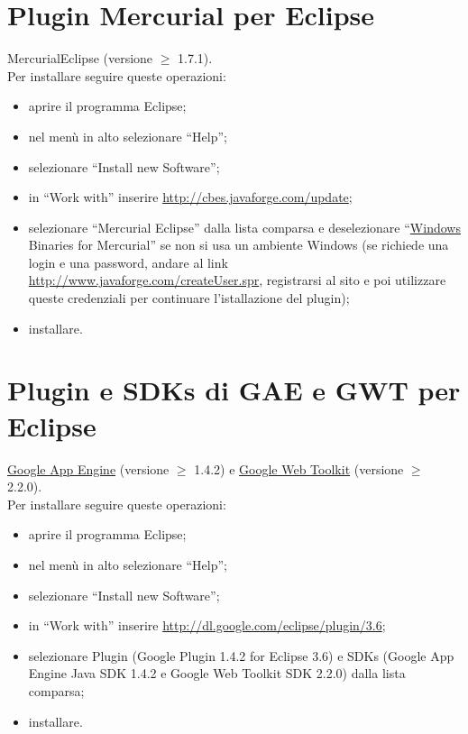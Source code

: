 \section{Plugin Mercurial per Eclipse}
MercurialEclipse (versione $\geq$ 1.7.1). 
\\
Per installare seguire queste
operazioni: 
\begin{itemize}
\item {aprire il programma Eclipse;} 
\item {nel men\`u in alto selezionare ``Help'';}
\item {selezionare ``Install new Software'';}
\item {in ``Work with'' inserire \url{http://cbes.javaforge.com/update};}
\item {selezionare ``Mercurial Eclipse'' dalla lista comparsa e deselezionare
``\underline{Windows} Binaries for Mercurial'' se non si usa un ambiente Windows
(se richiede una login e una password, andare al link
\url{http://www.javaforge.com/createUser.spr}, registrarsi al sito e poi
utilizzare queste credenziali per continuare l'istallazione del plugin);}
\item {installare.}
\end{itemize}

\section{Plugin e SDKs di GAE e GWT per Eclipse}
\underline{Google App Engine} (versione $\geq$ 1.4.2) e \underline{Google Web
Toolkit} (versione $\geq$ 2.2.0).
\\
Per installare seguire queste
operazioni: 
\begin{itemize}
\item {aprire il programma Eclipse;} 
\item {nel men\`u in alto selezionare ``Help'';}
\item {selezionare ``Install new Software'';}
\item {in ``Work with'' inserire \url{http://dl.google.com/eclipse/plugin/3.6};}
\item {selezionare Plugin (Google Plugin 1.4.2 for Eclipse 3.6) e SDKs (Google
App Engine Java SDK 1.4.2 e Google Web Toolkit SDK 2.2.0) dalla lista comparsa;}
\item {installare.}
\end{itemize} 

